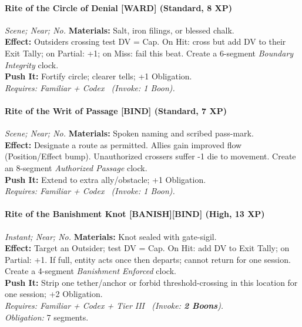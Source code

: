 \paragraph{Rite of the Circle of Denial \textnormal{[WARD]} (Standard, 8 XP)} \emph{Scene; Near; No.}
\textbf{Materials:} Salt, iron filings, or blessed chalk.\\
\textbf{Effect:} Outsiders crossing test DV = Cap. On Hit: cross but add DV to their Exit Tally; on Partial: +1; on Miss: fail this beat. Create a 6-segment \emph{Boundary Integrity} clock.\\
\textbf{Push It:} Fortify circle; clearer tells; +1 Obligation.\\
\emph{Requires: Familiar + Codex \ (\textit{Invoke:} 1 Boon).}

\paragraph{Rite of the Writ of Passage \textnormal{[BIND]} (Standard, 7 XP)} \emph{Scene; Near; No.}
\textbf{Materials:} Spoken naming and scribed pass-mark.\\
\textbf{Effect:} Designate a route as permitted. Allies gain improved flow (Position/Effect bump). Unauthorized crossers suffer -1 die to movement. Create an 8-segment \emph{Authorized Passage} clock.\\
\textbf{Push It:} Extend to extra ally/obstacle; +1 Obligation.\\
\emph{Requires: Familiar + Codex \ (\textit{Invoke:} 1 Boon).}

\paragraph{Rite of the Banishment Knot \textnormal{[BANISH][BIND]} (High, 13 XP)} \emph{Instant; Near; No.}
\textbf{Materials:} Knot sealed with gate-sigil.\\
\textbf{Effect:} Target an Outsider; test DV = Cap. On Hit: add DV to Exit Tally; on Partial: +1. If full, entity acts once then departs; cannot return for one session. Create a 4-segment \emph{Banishment Enforced} clock.\\
\textbf{Push It:} Strip one tether/anchor or forbid threshold-crossing in this location for one session; +2 Obligation.\\
\emph{Requires: Familiar + Codex + Tier III \ (\textit{Invoke:} \textbf{2 Boons}).}\\
\emph{Obligation:} 7 segments.

